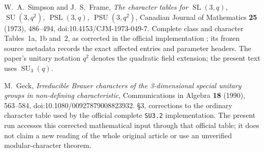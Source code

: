 W.~A.~Simpson and J.~S.~Frame,
\emph{The character tables for $\operatorname{SL}(3,q)$,
$\operatorname{SU}(3,q^2)$, $\operatorname{PSL}(3,q)$,
$\operatorname{PSU}(3,q^2)$}, Canadian Journal of Mathematics
\textbf{25} (1973), 486--494, doi:10.4153/CJM-1973-049-7.
Complete class and character Tables~1a, 1b and~2, as corrected
in the official implementation \cite{G2T:GCT}; its frozen source
metadata records the exact affected entries and parameter headers.
The paper's unitary notation $q^2$ denotes the quadratic field
extension; the present text uses $\operatorname{SU}_3(q)$.

M.~Geck, \emph{Irreducible Brauer characters of the 3-dimensional
special unitary groups in non-defining characteristic},
Communications in Algebra \textbf{18} (1990), 563--584,
doi:10.1080/00927879008823932.
\S3, corrections to the ordinary character table used by the
official complete \texttt{SU3.2} implementation.  The present
run accesses this corrected mathematical input through that
official table; it does not claim a new reading of the whole
original article or use an unverified modular-character theorem.
